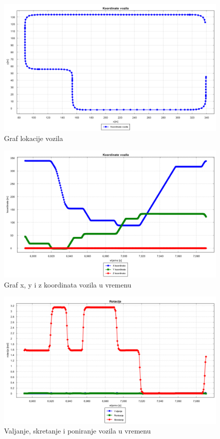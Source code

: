 \begin{figure}[h!]
  \includegraphics[scale=0.4]{images/koordinate.png}
  \caption{Graf lokacije vozila}
  \label{fig:gt_lokacija}
\end{figure}
\pagebreak
\begin{figure}[h!]
  \includegraphics[scale=0.4]{images/koordinate_vrijeme.png}
  \caption{Graf x, y i z koordinata vozila u vremenu}
  \label{fig:gt_lokacija_koord}
\end{figure}
\begin{figure}[h!]
  \includegraphics[scale=0.4]{images/rotacija_vrijeme.png}
  \caption{Valjanje, skretanje i poniranje vozila u vremenu}
  \label{fig:gt_rot_vr}
\end{figure}
